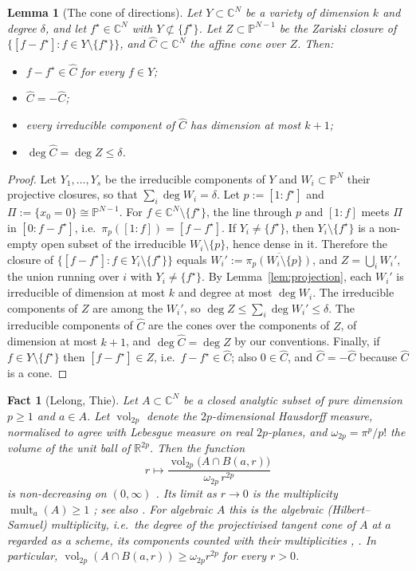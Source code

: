 \documentclass[11pt]{article}
\newtheorem{lemma}[theorem]{Lemma}
\newtheorem{fact}[theorem]{Fact}
\theoremstyle{definition}
\numberwithin{equation}{section}
\newcommand{\R}{\mathbb{R}}
\newcommand{\C}{\mathbb{C}}
\newcommand{\PP}{\mathbb{P}}
\newcommand{\fs}{f^{\star}}
\newcommand{\Ch}{\widehat{C}}
\DeclareMathOperator{\vol}{vol}
\DeclareMathOperator{\mult}{mult}
\begin{document}
\begin{lemma}[The cone of directions]\label{lem:cone}
Let $Y\subset\C^N$ be a variety of dimension $k$ and degree $\delta$, and let $\fs\in\C^N$ with $Y\not\subset\{\fs\}$. Let $Z\subset\PP^{N-1}$ be the Zariski closure of $\{[f-\fs]:f\in Y\setminus\{\fs\}\}$, and $\Ch\subset\C^N$ the affine cone over $Z$. Then:
\begin{itemize}
\item $f-\fs\in\Ch$ for every $f\in Y$;
\item $\Ch=-\Ch$;
\item every irreducible component of $\Ch$ has dimension at most $k+1$;
\item $\deg\Ch=\deg Z\le\delta$.
\end{itemize}
\end{lemma}

\begin{proof}
Let $Y_1,\dots,Y_s$ be the irreducible components of $Y$ and $W_i\subset\PP^N$ their projective closures, so that $\sum_i\deg W_i=\delta$. Let $p:=[1:\fs]$ and $\Pi:=\{x_0=0\}\cong\PP^{N-1}$. For $f\in\C^N\setminus\{\fs\}$, the line through $p$ and $[1:f]$ meets $\Pi$ in $[0:f-\fs]$, i.e.\ $\pi_p([1:f])=[f-\fs]$. If $Y_i\neq\{\fs\}$, then $Y_i\setminus\{\fs\}$ is a non-empty open subset of the irreducible $W_i\setminus\{p\}$, hence dense in it. Therefore the closure of $\{[f-\fs]:f\in Y_i\setminus\{\fs\}\}$ equals $W_i':=\overline{\pi_p(W_i\setminus\{p\})}$, and $Z=\bigcup_iW_i'$, the union running over $i$ with $Y_i\neq\{\fs\}$. By Lemma~\ref{lem:projection}, each $W_i'$ is irreducible of dimension at most $k$ and degree at most $\deg W_i$. The irreducible components of $Z$ are among the $W_i'$, so $\deg Z\le\sum_i\deg W_i'\le\delta$. The irreducible components of $\Ch$ are the cones over the components of $Z$, of dimension at most $k+1$, and $\deg\Ch=\deg Z$ by our conventions. Finally, if $f\in Y\setminus\{\fs\}$ then $[f-\fs]\in Z$, i.e.\ $f-\fs\in\Ch$; also $0\in\Ch$, and $\Ch=-\Ch$ because $\Ch$ is a cone.
\end{proof}

\begin{fact}[Lelong, Thie]\label{fact:lelong}
Let $A\subset\C^N$ be a closed analytic subset of pure dimension $p\ge1$ and $a\in A$. Let $\vol_{2p}$ denote the $2p$-dimensional Hausdorff measure, normalised to agree with Lebesgue measure on real $2p$-planes, and $\omega_{2p}=\pi^p/p!$ the volume of the unit ball of $\R^{2p}$. Then the function
\[
r\longmapsto\frac{\vol_{2p}\big(A\cap B(a,r)\big)}{\omega_{2p}\,r^{2p}}
\]
is non-decreasing on $(0,\infty)$ \cite{Lelong}. Its limit as $r\to0$ is the multiplicity $\mult_a(A)\ge1$ \cite{Thie}; see also \cite{Chirka,Demailly}. For algebraic $A$ this is the algebraic (Hilbert--Samuel) multiplicity, i.e.\ the degree of the projectivised tangent cone of $A$ at $a$ regarded as a scheme, its components counted with their multiplicities \cite[Lecture~20]{Harris}, \cite[Ch.~5]{Mumford}. In particular, $\vol_{2p}(A\cap B(a,r))\ge\omega_{2p}r^{2p}$ for every $r>0$.
\end{fact}
\end{document}
